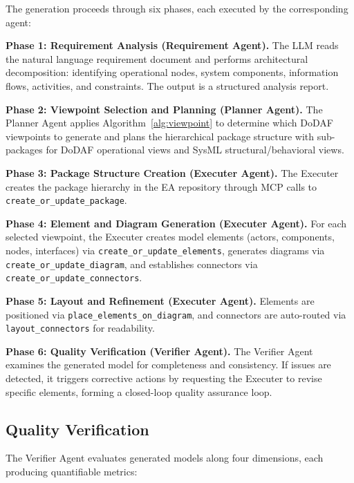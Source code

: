 \documentclass{ieeeaccess}
\begin{document}
The generation proceeds through six phases, each executed by the corresponding agent:

\textbf{Phase 1: Requirement Analysis (Requirement Agent).} The LLM reads the natural language requirement document and performs architectural decomposition: identifying operational nodes, system components, information flows, activities, and constraints. The output is a structured analysis report.

\textbf{Phase 2: Viewpoint Selection and Planning (Planner Agent).} The Planner Agent applies Algorithm~\ref{alg:viewpoint} to determine which DoDAF viewpoints to generate and plans the hierarchical package structure with sub-packages for DoDAF operational views and SysML structural/behavioral views.

\textbf{Phase 3: Package Structure Creation (Executer Agent).} The Executer creates the package hierarchy in the EA repository through MCP calls to \texttt{create\_or\_update\_package}.

\textbf{Phase 4: Element and Diagram Generation (Executer Agent).} For each selected viewpoint, the Executer creates model elements (actors, components, nodes, interfaces) via \texttt{create\_or\_update\_elements}, generates diagrams via \texttt{create\_or\_update\_diagram}, and establishes connectors via \texttt{create\_or\_update\_connectors}.

\textbf{Phase 5: Layout and Refinement (Executer Agent).} Elements are positioned via \texttt{place\_elements\_on\_diagram}, and connectors are auto-routed via \texttt{layout\_connectors} for readability.

\textbf{Phase 6: Quality Verification (Verifier Agent).} The Verifier Agent examines the generated model for completeness and consistency. If issues are detected, it triggers corrective actions by requesting the Executer to revise specific elements, forming a closed-loop quality assurance loop.

\subsection{Quality Verification}
\label{sec:quality_verification}

The Verifier Agent evaluates generated models along four dimensions, each producing quantifiable metrics:
\end{document}
